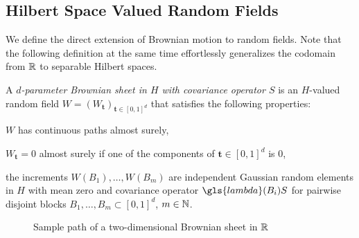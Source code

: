 \subsection{Hilbert Space Valued Random Fields}

We define the direct extension of Brownian motion to random fields. Note that the following definition at the same time effortlessly generalizes the codomain from $\mathbb{R}$ to separable Hilbert spaces.
\begin{defn}
    A \textit{$d$-parameter Brownian sheet in $H$ with covariance operator $S$} is an $H$-valued random field $W = (W_\mathbf{t})_{\mathbf{t} \in [0, 1]^d}$ that satisfies the following properties:
    \begin{aufzi}
        \item $W$ has continuous paths almost surely,
        \item $W_\mathbf{t} = 0$ almost surely if one of the components of $\mathbf{t} \in [0, 1]^d$ is $0$,
        \item the increments $W(B_1), \ldots, W(B_m)$ are independent Gaussian random elements in $H$ with mean zero and covariance operator $\gls{lambda}(B_i) S$ for pairwise disjoint blocks $B_1, \ldots, B_m \subset [0, 1]^d$, $m \in \mathbb{N}$.
    \end{aufzi}
\end{defn}

\begin{figure}%
    \centering
    \caption{Sample path of a two-dimensional Brownian sheet in $\mathbb{R}$}
\end{figure}

